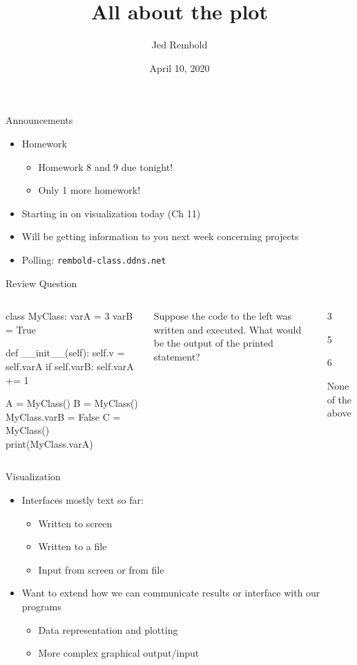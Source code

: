 \documentclass[pdf, aspectratio=169, 12pt]{beamer}
\title{All about the plot}
\author{Jed Rembold}
\date{April 10, 2020}
\begin{document}
\begin{frame}{Announcements}
	\begin{itemize}
		\item Homework
			\begin{itemize}
				\item Homework 8 and 9 due tonight!
				\item Only 1 more homework!
			\end{itemize}
		\item Starting in on visualization today (Ch 11)
		\item Will be getting information to you next week concerning projects
		\item Polling: \nolinkurl{rembold-class.ddns.net}
	\end{itemize}
\end{frame}

\begin{frame}[fragile]{Review Question}
	\begin{columns}
		\small
		\begin{pythoncode}
			class MyClass:
				varA = 3
				varB = True

				def __init__(self):
					self.v = self.varA
					if self.varB:
						self.varA += 1

			A = MyClass()
			B = MyClass()
			MyClass.varB = False
			C = MyClass()
			print(MyClass.varA)
		\end{pythoncode}
		Suppose the code to the left was written and executed. What would be the output of the printed statement?
		\begin{poll}
		\item 3
		\item 5
		\item 6
		\item None of the above
		\end{poll}
	\end{columns}
\end{frame}

\begin{frame}{Visualization}
	\begin{itemize}
		\item Interfaces mostly text so far:
			\begin{itemize}
				\item Written to screen
				\item Written to a file
				\item Input from screen or from file
			\end{itemize}
		\item Want to extend how we can communicate results or interface with our programs
			\begin{itemize}
				\item Data representation and plotting
				\item More complex graphical output/input
			\end{itemize}
	\end{itemize}
\end{frame}
\end{document}
